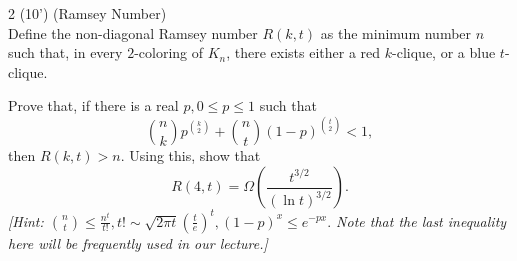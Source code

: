     \begin{question}{2 (10') (Ramsey Number)}~\\
    Define the non-diagonal Ramsey number $R(k,t)$ as the minimum number $n$ such that, in every $2$-coloring of $K_n$, there exists either a red $k$-clique, or a blue $t$-clique. 
    
    Prove that, if there is a real $p, 0\leq p\leq 1$ such that
    $$
    \binom{n}{k}p^{\binom{k}{2}}+\binom{n}{t}(1-p)^{\binom{t}{2}}<1,
    $$
    then $R(k,t)>n$. Using this, show that
    $$
    R(4,t)=\Omega\left(\frac{t^{3/2}}{(\ln t)^{3/2}}\right).
    $$
    \textit{[Hint: $\binom{n}{t} \le \frac{n^t}{t!},t! \sim \sqrt{2\pi t}(\frac{t}{e})^t, (1-p)^x \le e^{-px}.$ Note that the last inequality here will be frequently used in our lecture.]}
    \end{question}